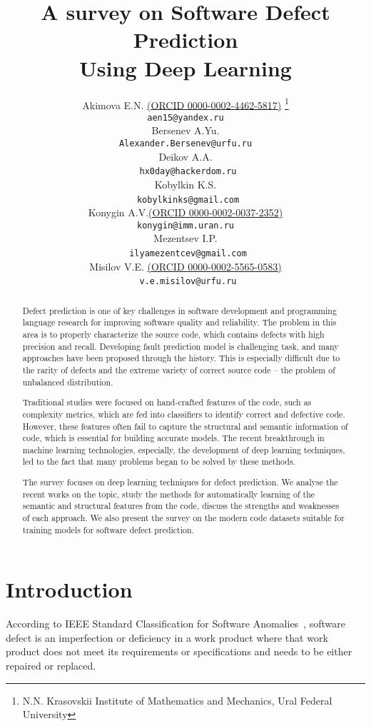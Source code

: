 \documentclass{article}
\title{A survey on Software Defect Prediction \\ Using Deep Learning}
\author{\hspace{1mm}Akimova E.N. \href{https://orcid.org/0000-0002-4462-5817}{(ORCID 0000-0002-4462-5817)} \thanks{N.N. Krasovskii Institute of Mathematics and Mechanics, Ural Federal University}\\
	\texttt{aen15@yandex.ru} \\
	\And
	\hspace{1mm}Bersenev A.Yu.\footnotemark[1]\\
	\texttt{Alexander.Bersenev@urfu.ru} \\
	\And
	\hspace{1mm}Deikov A.A.\footnotemark[1]\\\
	\texttt{hx0day@hackerdom.ru} \\
	\And
	\hspace{1mm}Kobylkin K.S.\footnotemark[1]\\\
	\texttt{kobylkinks@gmail.com} \\
	\And
	\hspace{1mm}Konygin A.V.\href{https://orcid.org/0000-0002-0037-2352}{(ORCID 0000-0002-0037-2352)} \footnotemark[1]\\
	\texttt{konygin@imm.uran.ru} \\
	\And
	\hspace{1mm}Mezentsev I.P.\footnotemark[1]\\\
	\texttt{ilyamezentcev@gmail.com} \\
	\And
	\hspace{1mm}Misilov V.E. \href{https://orcid.org/0000-0002-5565-0583}{(ORCID 0000-0002-5565-0583)} \footnotemark[1]\\\
	\texttt{v.e.misilov@urfu.ru} \\
}
\begin{document}
\maketitle

\begin{abstract}

Defect prediction is one of key challenges in software development and programming language research for improving software quality and reliability. 
The problem in this area is to properly characterize the source code, which contains defects with high precision and recall.
Developing fault prediction model is challenging task, and many approaches have been proposed through the history. This is especially difficult due to the rarity of defects and the extreme variety of correct source code -- the problem of unbalanced distribution.

Traditional studies were focused on hand-crafted features of the code, such as complexity metrics, which are fed into classifiers to identify correct and defective code. However, these features often fail to capture the structural and semantic information of code, which is essential for building accurate models. 
The recent breakthrough in machine learning technologies, especially, the development of deep learning techniques, led to the fact that many problems began to be solved by these methods.

The survey focuses on deep learning techniques for defect prediction. We analyse the recent works on the topic, study the methods for automatically learning of the semantic and structural features from the code, discuss the strengths and weaknesses of each approach. 
We also present the survey on the modern code datasets suitable for training models for software defect prediction.

\end{abstract}


\section{Introduction}

According to IEEE Standard Classification for Software Anomalies~\cite{ieee_standard}, software defect is an imperfection or deficiency in a work product where that work  product does not meet its requirements or specifications and needs to be either repaired or replaced.
\end{document}
